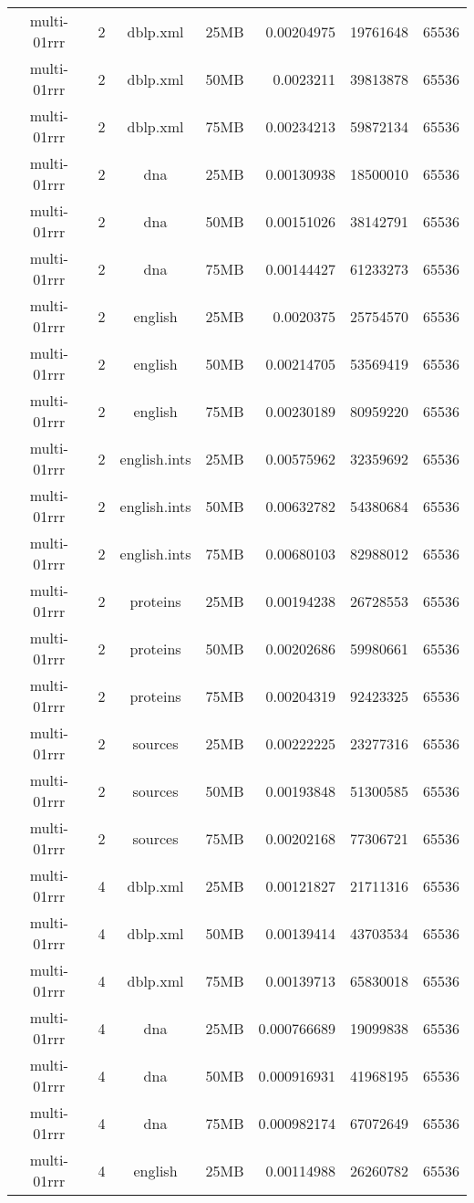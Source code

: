 \begin{table}[h]
\begin{center}
\begin{tabular}{ccccrrr}
multi-01rrr & 2 & dblp.xml & 25MB & 0.00204975 & 19761648 & 65536 \\
multi-01rrr & 2 & dblp.xml & 50MB & 0.0023211 & 39813878 & 65536 \\
multi-01rrr & 2 & dblp.xml & 75MB & 0.00234213 & 59872134 & 65536 \\
multi-01rrr & 2 & dna & 25MB & 0.00130938 & 18500010 & 65536 \\
multi-01rrr & 2 & dna & 50MB & 0.00151026 & 38142791 & 65536 \\
multi-01rrr & 2 & dna & 75MB & 0.00144427 & 61233273 & 65536 \\
multi-01rrr & 2 & english & 25MB & 0.0020375 & 25754570 & 65536 \\
multi-01rrr & 2 & english & 50MB & 0.00214705 & 53569419 & 65536 \\
multi-01rrr & 2 & english & 75MB & 0.00230189 & 80959220 & 65536 \\
multi-01rrr & 2 & english.ints & 25MB & 0.00575962 & 32359692 & 65536 \\
multi-01rrr & 2 & english.ints & 50MB & 0.00632782 & 54380684 & 65536 \\
multi-01rrr & 2 & english.ints & 75MB & 0.00680103 & 82988012 & 65536 \\
multi-01rrr & 2 & proteins & 25MB & 0.00194238 & 26728553 & 65536 \\
multi-01rrr & 2 & proteins & 50MB & 0.00202686 & 59980661 & 65536 \\
multi-01rrr & 2 & proteins & 75MB & 0.00204319 & 92423325 & 65536 \\
multi-01rrr & 2 & sources & 25MB & 0.00222225 & 23277316 & 65536 \\
multi-01rrr & 2 & sources & 50MB & 0.00193848 & 51300585 & 65536 \\
multi-01rrr & 2 & sources & 75MB & 0.00202168 & 77306721 & 65536 \\
multi-01rrr & 4 & dblp.xml & 25MB & 0.00121827 & 21711316 & 65536 \\
multi-01rrr & 4 & dblp.xml & 50MB & 0.00139414 & 43703534 & 65536 \\
multi-01rrr & 4 & dblp.xml & 75MB & 0.00139713 & 65830018 & 65536 \\
multi-01rrr & 4 & dna & 25MB & 0.000766689 & 19099838 & 65536 \\
multi-01rrr & 4 & dna & 50MB & 0.000916931 & 41968195 & 65536 \\
multi-01rrr & 4 & dna & 75MB & 0.000982174 & 67072649 & 65536 \\
multi-01rrr & 4 & english & 25MB & 0.00114988 & 26260782 & 65536 \\

\end{tabular}
\end{center}
\end{table}

